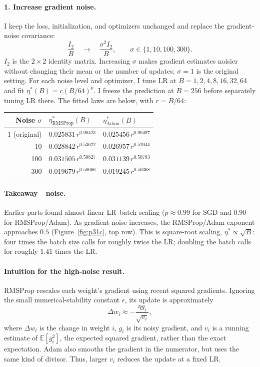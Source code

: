 \documentclass{article}
\begin{document}
\paragraph{1. Increase gradient noise.}
I keep the loss, initialization, and optimizers unchanged and replace
the gradient-noise covariance:
\[
\frac{I_2}{B}\quad\longrightarrow\quad\frac{\sigma^2I_2}{B},
\qquad \sigma\in\{1,10,100,300\}.
\]
$I_2$ is the $2\times2$ identity matrix. Increasing $\sigma$ makes
gradient estimates noisier without changing their mean or the number
of updates; $\sigma=1$ is the original setting.
For each noise level and optimizer, I tune LR at $B=1,2,4,8,16,32,64$
and fit $\eta^*(B)=c(B/64)^p$. I freeze the prediction at $B=256$
before separately tuning LR there. The fitted laws are below, with $r=B/64$:

\begin{center}
\small
\begin{tabular}{rll}
\toprule
Noise $\sigma$ & $\eta^*_{\mathrm{RMSProp}}(B)$ & $\eta^*_{\mathrm{Adam}}(B)$ \\
\midrule
1 (original) & $0.025831\,r^{0.90423}$ & $0.025456\,r^{0.90497}$ \\
10  & $0.028842\,r^{0.53622}$ & $0.026957\,r^{0.52044}$ \\
100 & $0.031505\,r^{0.50827}$ & $0.031139\,r^{0.50783}$ \\
300 & $0.019679\,r^{0.50666}$ & $0.019245\,r^{0.50368}$ \\
\bottomrule
\end{tabular}
\end{center}

\paragraph{Takeaway---noise.} Earlier parts found almost linear LR--batch
scaling ($p\approx0.99$ for SGD and $0.90$ for RMSProp/Adam).
As gradient noise increases, the RMSProp/Adam exponent approaches
$0.5$ (Figure~\ref{fig:p31c}, top row). This is square-root scaling,
$\eta^*\propto\sqrt B$: four times the batch size calls for roughly
twice the LR; doubling the batch calls for roughly $1.41$ times the LR.

\paragraph{Intuition for the high-noise result.}
RMSProp rescales each weight's gradient using recent squared gradients.
Ignoring the small numerical-stability constant $\epsilon$, its update
is approximately
\[
\Delta w_i\approx-\frac{\eta g_i}{\sqrt{v_i}},
\]
where $\Delta w_i$ is the change in weight $i$, $g_i$ is its noisy gradient,
and $v_i$ is a running estimate of $\mathbb E[g_i^2]$, the expected
squared gradient, rather than the exact expectation. Adam also smooths
the gradient in the numerator, but uses the same kind of divisor.
Thus, larger $v_i$ reduces the update at a fixed LR.
\end{document}
